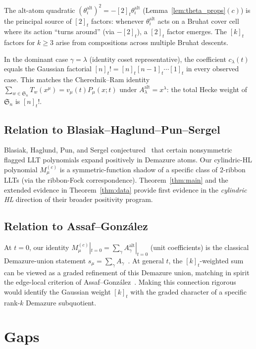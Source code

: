 \documentclass[11pt]{article}
\theoremstyle{definition}
\newcommand{\gauss}[1]{[#1]_t}
\newcommand{\gaussfact}[1]{\gauss{#1}!}
\newcommand{\Aalt}{A^{\mathrm{alt}}}
\newcommand{\Cmu}{M^{(c)}_{\mu}}
\newcommand{\theal}{\theta^{\mathrm{alt}}}
\newcommand{\Sn}{\mathfrak{S}_n}
\begin{document}
The alt-atom quadratic $(\theal_i)^2 = -\gauss{2}\theal_i$ (Lemma~\ref{lem:theta_props}$(c)$) is the
principal source of $\gauss{2}$ factors: whenever $\theal_i$ acts on a Bruhat cover cell where
its action ``turns around'' (via $-\gauss{2}$), a $\gauss{2}$ factor emerges. The $\gauss{k}$
factors for $k\ge 3$ arise from compositions across multiple Bruhat descents.

In the dominant case $\gamma=\lambda$ (identity coset representative), the coefficient
$c_\lambda(t)$ equals the Gaussian factorial $\gaussfact{n}=\gauss{n}\gauss{n-1}\cdots\gauss{1}$
in every observed case. This matches the Cherednik--Ram identity
$\sum_{w\in\Sn} T_w(x^\mu) = v_\mu(t)P_\mu(x;t)$ under $\Aalt_\lambda = x^\lambda$: the total
Hecke weight of $\Sn$ is $\gaussfact{n}$.

\subsection{Relation to Blasiak--Haglund--Pun--Sergel}

Blasiak, Haglund, Pun, and Sergel conjectured~\cite{BHPS} that certain nonsymmetric flagged
LLT polynomials expand positively in Demazure atoms. Our cylindric-HL polynomial $\Cmu$
is a symmetric-function shadow of a specific class of $2$-ribbon LLTs (via the ribbon-Fock
correspondence). Theorem~\ref{thm:main} and the extended evidence in
Theorem~\ref{thm:data} provide first evidence in the \emph{cylindric HL} direction of
their broader positivity program.

\subsection{Relation to Assaf--Gonz\'alez}

At $t=0$, our identity $M^{(c)}_\mu|_{t=0} = \sum_\gamma \Aalt_\gamma|_{t=0}$ (unit coefficients)
is the classical Demazure-union statement $s_\mu = \sum_\gamma A_\gamma$~\cite{Mason}. At
general $t$, the $\gauss{k}$-weighted sum can be viewed as a graded refinement of this
Demazure union, matching in spirit the edge-local criterion of
Assaf--Gonz\'alez~\cite{AG25}. Making this connection rigorous would identify the Gaussian
weight $\gauss{k}$ with the graded character of a specific rank-$k$ Demazure subquotient.

\section{Gaps}
\end{document}
